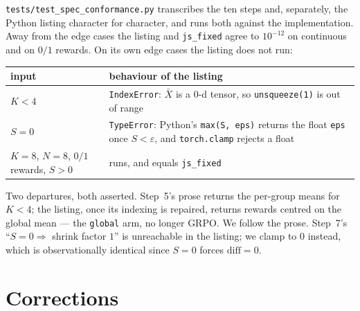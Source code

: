 \documentclass{article}
\newcommand{\arm}[1]{\texttt{#1}}
\begin{document}
\texttt{tests/test\_spec\_conformance.py} transcribes the ten steps and,
separately, the Python listing character for character, and runs both
against the implementation. Away from the edge cases the listing and
\arm{js\_fixed} agree to $10^{-12}$ on continuous and on $0/1$ rewards. On
its own edge cases the listing does not run:

\begin{center}\small
\begin{tabular}{lp{8.6cm}}
\toprule
input & behaviour of the listing \\
\midrule
$K<4$ & \texttt{IndexError}: $\bar X$ is a 0-d tensor, so \texttt{unsqueeze(1)} is out of range \\
$S=0$ & \texttt{TypeError}: Python's \texttt{max(S, eps)} returns the float \texttt{eps} once $S<\varepsilon$, and \texttt{torch.clamp} rejects a float \\
$K=8$, $N=8$, $0/1$ rewards, $S>0$ & runs, and equals \arm{js\_fixed} \\
\bottomrule
\end{tabular}
\end{center}

Two departures, both asserted. Step~5's prose returns the per-group means
for $K<4$; the listing, once its indexing is repaired, returns rewards
centred on the global mean --- the \arm{global} arm, no longer GRPO. We
follow the prose. Step~7's ``$S=0\Rightarrow$ shrink factor $1$'' is
unreachable in the listing; we clamp to $0$ instead, which is
observationally identical since $S=0$ forces $\mathrm{diff}=0$.

\section{Corrections}
\label{app:corrections}
\end{document}
